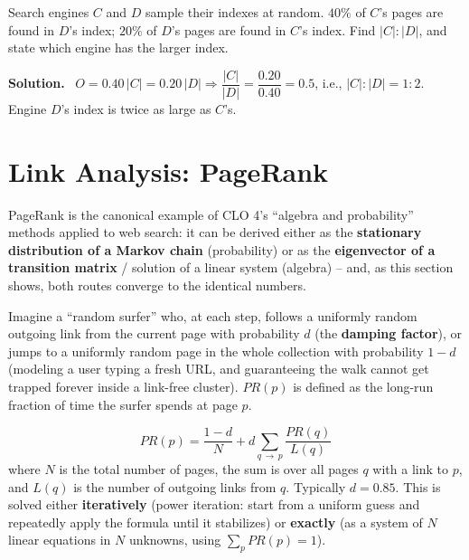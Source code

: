 \documentclass[11pt, a4paper]{article}
\newcommand{\Solution}{\medskip\noindent\textbf{\color{exgreen}Solution.}\ }
\begin{document}
\begin{exercisebox}
Search engines $C$ and $D$ sample their indexes at random. $40\%$ of $C$'s pages are found in $D$'s index; $20\%$ of $D$'s pages are found in $C$'s index. Find $|C|:|D|$, and state which engine has the larger index.
\end{exercisebox}

\Solution
$O = 0.40\,|C| = 0.20\,|D| \Rightarrow \dfrac{|C|}{|D|} = \dfrac{0.20}{0.40} = 0.5$, i.e., $|C|:|D| = 1:2$. Engine $D$'s index is twice as large as $C$'s.

\section{Link Analysis: PageRank}
\label{sec:pagerank}

PageRank is the canonical example of CLO 4's ``algebra and probability'' methods applied to web search: it can be derived either as the \textbf{stationary distribution of a Markov chain} (probability) or as the \textbf{eigenvector of a transition matrix} / solution of a linear system (algebra) -- and, as this section shows, both routes converge to the identical numbers.

\begin{defbox}
Imagine a ``random surfer'' who, at each step, follows a uniformly random outgoing link from the current page with probability $d$ (the \textbf{damping factor}), or jumps to a uniformly random page in the whole collection with probability $1-d$ (modeling a user typing a fresh URL, and guaranteeing the walk cannot get trapped forever inside a link-free cluster). $PR(p)$ is defined as the long-run fraction of time the surfer spends at page $p$.
\end{defbox}

\begin{formulabox}
\[
PR(p) = \frac{1-d}{N} + d \sum_{q \,\to\, p} \frac{PR(q)}{L(q)}
\]
where $N$ is the total number of pages, the sum is over all pages $q$ with a link to $p$, and $L(q)$ is the number of outgoing links from $q$. Typically $d=0.85$. This is solved either \textbf{iteratively} (power iteration: start from a uniform guess and repeatedly apply the formula until it stabilizes) or \textbf{exactly} (as a system of $N$ linear equations in $N$ unknowns, using $\sum_p PR(p)=1$).
\end{formulabox}
\end{document}
